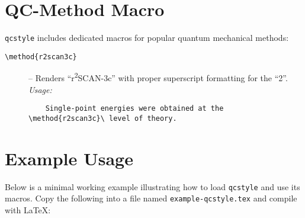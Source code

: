 \documentclass[a4paper,12pt]{article}
\begin{document}
\section{QC-Method Macro}
\label{sec:qcmethods}
\texttt{qcstyle} includes  dedicated macros for popular quantum mechanical methods:

\begin{description}
    \item[\texttt{\textbackslash method\{r2scan3c\}}] – Renders “r\textsuperscript{2}SCAN-3c” with proper superscript formatting for the “2”.\\
    \textit{Usage:}
    \begin{verbatim}
    Single-point energies were obtained at the \method{r2scan3c}\ level of theory.
    \end{verbatim}
\end{description}

\section{Example Usage}
\label{sec:example}
Below is a minimal working example illustrating how to load \texttt{qcstyle} and use its macros. Copy the following into a file named \texttt{example-qcstyle.tex} and compile with \LaTeX:
\end{document}
